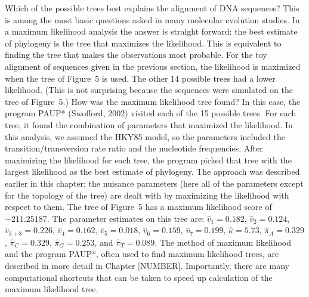 \documentclass{svmult}
\begin{document}
Which of the possible trees best explains the alignment of DNA sequences? This is among the most basic questions asked in many molecular evolution studies. In a maximum likelihood analysis the answer is straight forward: the
best estimate of phylogeny is the tree that maximizes the likelihood. This is equivalent to finding the tree that makes the observations
most probable. For the toy alignment of sequences given in the previous section, the likelihood is maximized when the tree of
Figure~5 is used. The other 14 possible trees had a lower likelihood. (This is not surprising because the sequences were simulated on the tree of Figure~5.)
How was the maximum likelihood tree found? In this case, the program
PAUP* (Swofford, 2002) visited each of the 15 possible trees. For each tree, it found the combination of parameters that maximized the
likelihood. In this analysis, we assumed the HKY85 model, so the parameters included the transition/transversion
rate ratio and the nucleotide frequencies. After maximizing the likelihood for each tree, the program picked that tree with the largest likelihood as the best estimate of phylogeny. The approach was described earlier in this chapter; the nuisance parameters (here all of the parameters
except for the topology of the tree) are dealt with by maximizing the likelihood with respect to them. The tree of Figure~5 has a maximum
likelihood score of $-211.25187$. The parameter estimates on this tree are:
$\hat{v}_1 = 0.182$,
$\hat{v}_2 = 0.124$,
$\hat{v}_{3 + 8} = 0.226$,
$\hat{v}_4 = 0.162$,
$\hat{v}_5 = 0.018$,
$\hat{v}_6 = 0.159$,
$\hat{v}_7 = 0.199$,
$\hat{\kappa} = 5.73$,
$\hat{\pi}_A = 0.329$,
$\hat{\pi}_C = 0.329$,
$\hat{\pi}_G = 0.253$, and
$\hat{\pi}_T = 0.089$.
The method of maximum likelihood and the program PAUP*, often used to find maximum likelihood trees, are described in more
detail in Chapter [NUMBER]. Importantly, there are many computational shortcuts that can be taken to speed up calculation of the maximum likelihood
tree.
\end{document}
